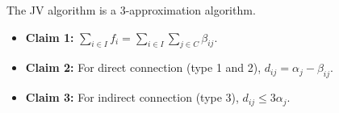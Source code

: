 \documentclass[handout, hyperref, xcolor=dvipsnames]{beamer}
\begin{document}
\begin{frame}
  \begin{theorem}
    The JV algorithm is a $3$-approximation algorithm.
  \end{theorem}
  \begin{itemize}
  \item \textbf{Claim 1:}
    $\sum_{i\in I} f_i = \sum_{i\in I} \sum_{j\in C} \beta_{ij}$.
  \item \textbf{Claim 2:}
    For direct connection (type 1 and 2), $d_{ij} = \alpha_j - \beta_{ij}$.
  \item \textbf{Claim 3:}
    For indirect connection (type 3), $d_{ij} \leq 3 \alpha_j$.
  \end{itemize}
\end{frame}
\end{document}
